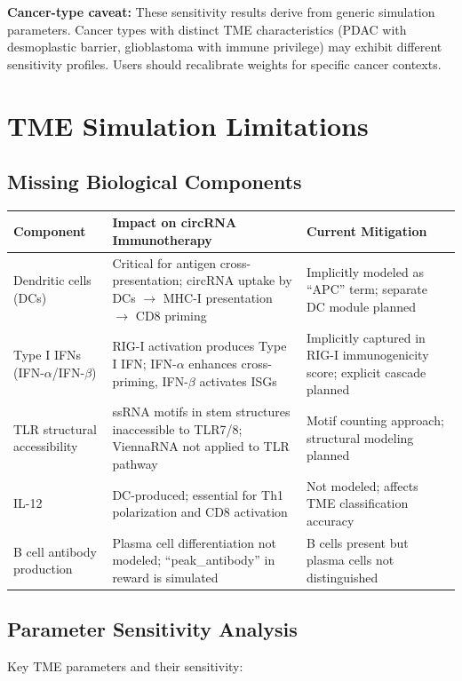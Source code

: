 \documentclass{article}
\begin{document}
\textbf{Cancer-type caveat:} These sensitivity results derive from generic simulation parameters. Cancer types with distinct TME characteristics (PDAC with desmoplastic barrier, glioblastoma with immune privilege) may exhibit different sensitivity profiles. Users should recalibrate weights for specific cancer contexts.

\section{TME Simulation Limitations}

\subsection{Missing Biological Components}

\begin{longtable}{p{3cm}p{4cm}p{4cm}}
\toprule
Component & Impact on circRNA Immunotherapy & Current Mitigation \\
\midrule
Dendritic cells (DCs) & Critical for antigen cross-presentation; circRNA uptake by DCs $\rightarrow$ MHC-I presentation $\rightarrow$ CD8 priming & Implicitly modeled as ``APC'' term; separate DC module planned \\
Type I IFNs (IFN-$\alpha$/IFN-$\beta$) & RIG-I activation produces Type I IFN; IFN-$\alpha$ enhances cross-priming, IFN-$\beta$ activates ISGs & Implicitly captured in RIG-I immunogenicity score; explicit cascade planned \\
TLR structural accessibility & ssRNA motifs in stem structures inaccessible to TLR7/8; ViennaRNA not applied to TLR pathway & Motif counting approach; structural modeling planned \\
IL-12 & DC-produced; essential for Th1 polarization and CD8 activation & Not modeled; affects TME classification accuracy \\
B cell antibody production & Plasma cell differentiation not modeled; ``peak\_antibody'' in reward is simulated & B cells present but plasma cells not distinguished \\
\bottomrule
\end{longtable}

\subsection{Parameter Sensitivity Analysis}

Key TME parameters and their sensitivity:
\end{document}
